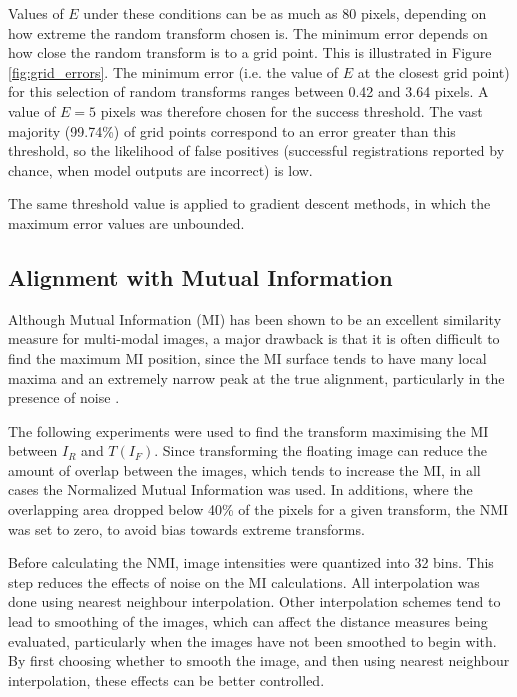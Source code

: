 \documentclass{report}
\begin{document}
Values of $E$ under these conditions can be as much as 80 pixels, depending on how extreme the random transform chosen is. The minimum error depends on how close the random transform is to a grid point. This is illustrated in Figure \ref{fig:grid_errors}. The minimum error (i.e. the value of $E$ at the closest grid point) for this selection of random transforms ranges between 0.42 and 3.64 pixels. A value of $E=5$ pixels was therefore chosen for the success threshold. The vast majority (99.74\%) of grid points correspond to an error greater than this threshold, so the likelihood of false positives (successful registrations reported by chance, when model outputs are incorrect) is low.

The same threshold value is applied to gradient descent methods, in which the maximum error values are unbounded.


\subsection{Alignment with Mutual Information}
\label{sec:mi_results}
Although Mutual Information (MI) has been shown to be an excellent similarity measure for multi-modal images,
a major drawback is that it is often difficult to find the maximum MI position, since the MI surface tends to have many local maxima and an extremely narrow peak at the true alignment, particularly in the presence of noise \citep{maes1997multimodality}. 

The following experiments were used to find the transform maximising the MI between $I_R$ and $T(I_F)$. Since transforming the floating image can reduce the amount of overlap between the images, which tends to increase the MI, in all cases the Normalized Mutual Information was used. In additions, where the overlapping area dropped below 40\% of the pixels for a given transform, the NMI was set to zero, to avoid bias towards extreme transforms.

Before calculating the NMI, image intensities were quantized into 32 bins. This step reduces the effects of noise on the MI calculations. All interpolation was done using nearest neighbour interpolation. Other interpolation schemes tend to lead to smoothing of the images, which can affect the distance measures being evaluated, particularly when the images have not been smoothed to begin with. By first choosing whether to smooth the image, and then using nearest neighbour interpolation, these effects can be better controlled.
\end{document}
